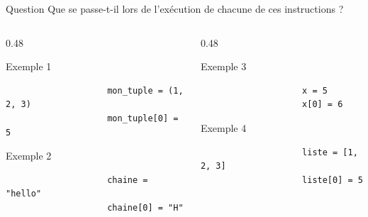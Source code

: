 \documentclass[10pt, xcolor={svgnames}]{beamer}
\begin{document}
\begin{frame}[fragile]
	
	\begin{block}{Question}
		Que se passe-t-il lors de l'exécution de chacune
		de ces instructions ?
	\end{block}
	
	\vspace{0.15cm}
	
	\begin{columns}[T]
		\begin{column}{0.48\textwidth}
			\begin{exampleblock}{Exemple 1}
				\begin{verbatim}
					mon_tuple = (1, 2, 3)
					mon_tuple[0] = 5
				\end{verbatim}
			\end{exampleblock}
			
			\begin{exampleblock}{Exemple 2}
				\begin{verbatim}
					chaine = "hello"
					chaine[0] = "H"
				\end{verbatim}
			\end{exampleblock}
		\end{column}
		
		\begin{column}{0.48\textwidth}
			\begin{exampleblock}{Exemple 3}
				\begin{verbatim}
					x = 5
					x[0] = 6
				\end{verbatim}
			\end{exampleblock}
			
			\begin{exampleblock}{Exemple 4}
				\begin{verbatim}
					liste = [1, 2, 3]
					liste[0] = 5
				\end{verbatim}
			\end{exampleblock}
		\end{column}
	\end{columns}
	
	\vspace{0.15cm}
	
\end{frame}
\end{document}

